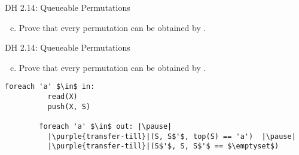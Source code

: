 \begin{frame}[fragile]{}
  \begin{exampleblock}{DH 2.14: Queueable Permutations}
    \begin{enumerate}[(a)]
      \setcounter{enumi}{2}
      \item Prove that every permutation can be obtained by .
    \end{enumerate}
  \end{exampleblock}

  \vspace{0.30cm}
\end{frame}

\begin{frame}[fragile]{}
  \begin{exampleblock}{DH 2.14: Queueable Permutations}
    \begin{enumerate}[(a)]
      \setcounter{enumi}{2}
      \item Prove that every permutation can be obtained by .
    \end{enumerate}
  \end{exampleblock}

  \vspace{0.30cm}
  \begin{lstlisting}[style = Cstyle]
        foreach 'a' $\in$ in:
          read(X)
          push(X, S)
        
        foreach 'a' $\in$ out: |\pause|
          |\purple{transfer-till}|(S, S$'$, top(S) == 'a')  |\pause|
          |\purple{transfer-till}|(S$'$, S, S$'$ == $\emptyset$)
  \end{lstlisting}
\end{frame}


